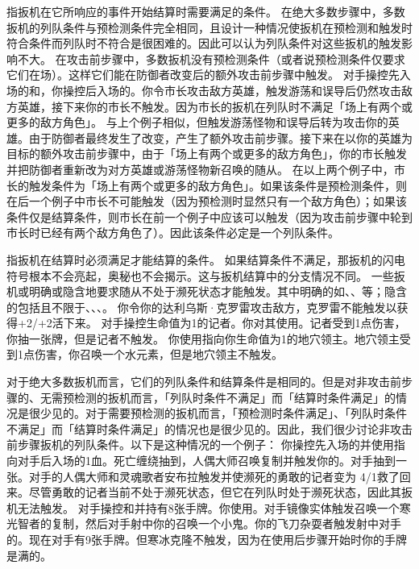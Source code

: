 指扳机在它所响应的事件开始结算时需要满足的条件。
\notice 在绝大多数步骤中，多数扳机的列队条件与预检测条件完全相同，且设计一种情况使扳机在预检测和触发时符合条件而列队时不符合是很困难的。因此可以认为列队条件对这些扳机的触发影响不大。
\notice 在攻击前步骤中，多数扳机没有预检测条件（或者说预检测条件仅要求它们在场）。这样它们能在防御者改变后的额外攻击前步骤中触发。
\example 对手操控先入场的和，你操控后入场的。你令市长攻击敌方英雄，触发游荡和误导后仍然攻击敌方英雄，接下来你的市长不触发。因为市长的扳机在列队时不满足「场上有两个或更多的敌方角色」。
\example 与上个例子相似，但触发游荡怪物和误导后转为攻击你的英雄。由于防御者最终发生了改变，产生了额外攻击前步骤。接下来在以你的英雄为目标的额外攻击前步骤中，由于「场上有两个或更多的敌方角色」，你的市长触发并把防御者重新改为对方英雄或游荡怪物新召唤的随从。
\notice 在以上两个例子中，市长的触发条件为「场上有两个或更多的敌方角色」。如果该条件是预检测条件，则在后一个例子中市长不可能触发（因为预检测时显然只有一个敌方角色）；如果该条件仅是结算条件，则市长在前一个例子中应该可以触发（因为攻击前步骤中轮到市长时已经有两个敌方角色了）。因此该条件必定是一个列队条件。

指扳机在结算时必须满足才能结算的条件。
\notice 如果结算条件不满足，那扳机的闪电符号根本不会亮起，奥秘也不会揭示。这与扳机结算中的分支情况不同。
\notice 一些扳机或明确或隐含地要求随从不处于濒死状态才能触发。其中明确的如、、等；隐含的包括且不限于、、、。
\example 你令你的达利乌斯·克罗雷攻击敌方，克罗雷不能触发以获得+2/+2活下来。
\example {}对手操控生命值为1的记者。你对其使用。记者受到1点伤害，你抽一张牌，但是记者不触发。
\example {}你使用指向你生命值为1的地穴领主。地穴领主受到1点伤害，你召唤一个水元素，但是地穴领主不触发。

对于绝大多数扳机而言，它们的列队条件和结算条件是相同的。但是对非攻击前步骤的、无需预检测的扳机而言，「列队时条件不满足」而「结算时条件满足」的情况是很少见的。对于需要预检测的扳机而言，「预检测时条件满足」、「列队时条件不满足」而「结算时条件满足」的情况也是很少见的。因此，我们很少讨论非攻击前步骤扳机的列队条件。以下是这种情况的一个例子：
\example 你操控先入场的并使用指向对手后入场的1血。死亡缠绕抽到，人偶大师召唤复制并触发你的。对手抽到一张。对手的人偶大师和灵魂歌者安布拉触发并使濒死的勇敢的记者变为 4/1救了回来。尽管勇敢的记者当前不处于濒死状态，但它在列队时处于濒死状态，因此其扳机无法触发。
\example 对手操控和并持有8张手牌。你使用。对手镜像实体触发召唤一个寒光智者的复制，然后对手射中你的召唤一个小鬼。你的飞刀杂耍者触发射中对手的。现在对手有9张手牌。但寒冰克隆不触发，因为在使用后步骤开始时你的手牌是满的。

